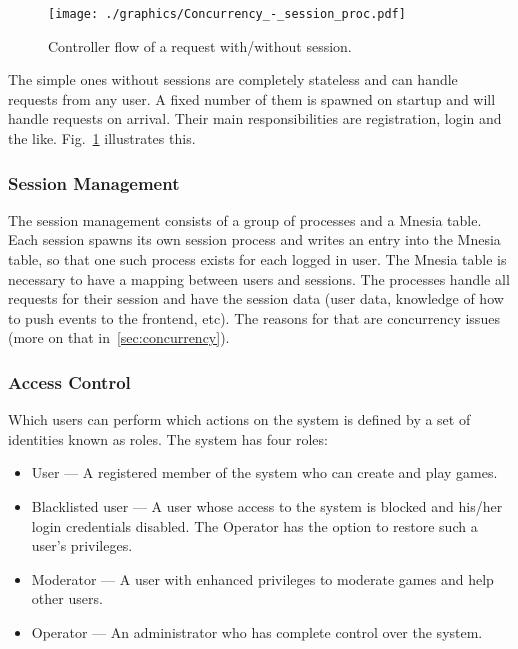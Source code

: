 \documentclass[11pt,a4paper]{report}
\begin{document}
\begin{figure}[h]
 \centering
 \texttt{[image: ./graphics/Concurrency\_-\_session\_proc.pdf]}
 \vspace{-1cm}
 \caption{Controller flow of a request with/without session.}
 \label{fig:controller:session_proc}
\end{figure}

The simple ones without sessions are completely stateless and can handle
requests from any user.
A fixed number of them is spawned on startup and will handle requests on
arrival.
Their main responsibilities are registration, login and the like.
Fig.~\ref{fig:controller:session_proc} illustrates this.

\subsubsection{Session Management}
\label{sec:session}
The session management consists of a group of processes and a Mnesia table.
Each session spawns its own session process and writes an entry into the Mnesia
table, so that one such process exists for each logged in user.
The Mnesia table is necessary to have a mapping between users and sessions.
The processes handle all requests for their session and have the session data
(user data, knowledge of how to push events to the frontend, etc).
The reasons for that are concurrency issues
(more on that in~\ref{sec:concurrency}).


\subsubsection{Access Control}
Which users can perform which actions on the system is defined by a set of
identities known as roles. The system has four roles:

\begin{itemize}
\item User --- A registered member of the system who can create and play games.
\item Blacklisted user --- A user whose access to the system is blocked and his/her
login credentials disabled. The Operator has the option to restore such a user's
privileges.
\item Moderator --- A user with enhanced privileges to moderate games and help
other users.
\item Operator --- An administrator who has complete control over the system.

\end{itemize}
\end{document}
